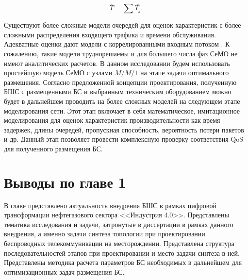 \begin{equation}
    \label{eq:end_to_end_delay}
    \overline{T}= \sum{\overline{T_j}}.
\end{equation}


Существуют более сложные модели очередей для оценок характеристик с более сложными распределения входящего трафика и времени обслуживания. Адекватные оценки дают модели с коррелированными входным потоком \cite{Vishnevsky2016_Methods_of_performance, Larionov2019}. К сожалению, такие модели труднорешаемы и для большего числа фаз СеМО не имеют аналитических расчетов. В данном исследовании будем использовать простейшую модель СеМО с узлами $M/M/1$ на этапе задачи оптимального размещения. Согласно предложенной концепции проектирования, полученную БШС с размещенными БС и выбранным техническим оборудованием можно будет в дальнейшем проводить на более сложных моделей на следующем этапе моделирования сети. Этот этап включает в себя математическое, имитационное моделирования для оценок характеристик производительности как время задержек, длины очередей, пропускная способность, вероятность потери пакетов и др. Данный этап позволяет провести комплексную проверку соответствия QoS для полученного размещения БС.

\section{Выводы по главе 1}
 
В главе представлено актуальность внедрения БШС в рамках цифровой трансформации нефтегазового сектора <<Индустрия 4.0>>. Представлены тематика исследования и задачи, затронутые в диссертации в рамках данного внедрения, а именно задачи синтеза топологии при проектировании беспроводных телекоммуникации на месторождении. Представлена структура последовательностей этапов при проектировании и место задачи синтеза в ней. Представлены методика расчета 
параметров БС необходимых в дальнейшем для оптимизационных задач размещения БС. 








\FloatBarrier
